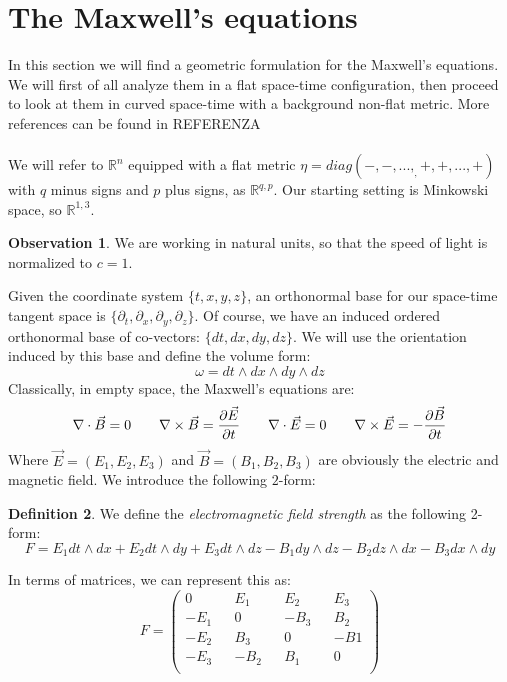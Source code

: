 \documentclass[12pt,a4paper]{report}
\theoremstyle{definition}
\newtheorem{Def}{Definition}[chapter]
\theoremstyle{Theorem}
\theoremstyle{definition}
\theoremstyle{definition}
\newtheorem{Obs}[Def]{Observation}
\begin{document}
	\section{The Maxwell's equations}
	In this section we will find a geometric formulation for the Maxwell's equations. We will first of all analyze them in a flat space-time configuration, then proceed to look at them in curved space-time with a background non-flat metric. More references can be found in REFERENZA\\
	\\
	We will refer to $\mathbb{R}^n$ equipped with a flat metric $\eta=diag(-,-,...,_,+,+,...,+)$ with $q$ minus signs and $p$ plus signs, as $\mathbb{R}^{q,p}$. Our starting setting is Minkowski space, so $\mathbb{R}^{1,3}$.
	\begin{Obs}
		We are working in natural units, so that the speed of light is normalized to $c=1$.
	\end{Obs}
	Given the coordinate system $\{t,x,y,z\}$, an orthonormal base for our space-time tangent space is $\{\partial_t,\partial_x,\partial_y,\partial_z\}$. Of course, we have an induced ordered orthonormal base of co-vectors: $\{dt,dx,dy,dz\}$. We will use the orientation induced by this base and define the volume form:
	$$\omega=dt\wedge dx\wedge dy\wedge dz$$
	Classically, in empty space, the Maxwell's equations are:
	\begin{equation}\label{M.E.}
		\nabla \cdot \vec{B} =0 \hspace{20 pt} \nabla \times \vec{B}={\partial \vec{E}\over \partial t}\hspace{20 pt}\nabla \cdot \vec{E} =0 \hspace{20 pt} \nabla \times \vec{E}=-{\partial \vec{B}\over \partial t}
	\end{equation}
	Where $\vec{E}=(E_1,E_2,E_3)$ and $\vec{B}=(B_1,B_2,B_3)$ are obviously the electric and magnetic field.
	We introduce the following $2$-form:
	\begin{Def}
		We define the \textit{electromagnetic  field strength} as the following 2-form:
		$$F=E_1 dt\wedge dx+E_2 dt\wedge dy+E_3 dt\wedge dz-B_1 dy\wedge dz-B_2 dz\wedge dx-B_3 dx\wedge dy$$
	\end{Def}
	In terms of matrices, we can represent this as:
	$$F=\begin{pmatrix}
		0 && E_1 && E_2 && E_3\\
		-E_1 && 0 && -B_3 && B_2\\
		-E_2 &&  B_3 && 0 && -B1\\
		-E_3 && -B_2 && B_1 && 0\\ 
	\end{pmatrix}$$
\end{document}
